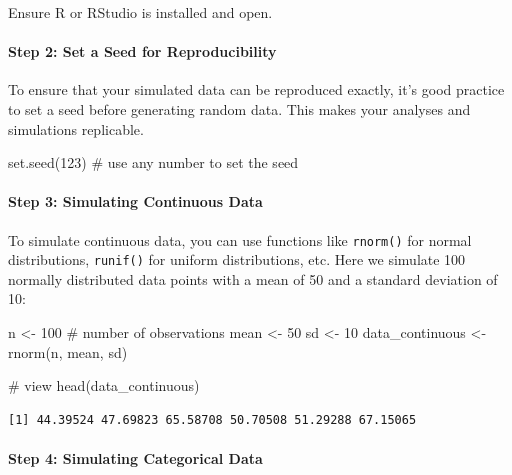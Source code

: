 \documentclass[
  singlecolumn]{article}
\let\oldparagraph\paragraph
\renewcommand{\paragraph}[1]{\oldparagraph{#1}\mbox{}}
\newenvironment{Shaded}{}{}
\newcommand{\CommentTok}[1]{\textcolor[rgb]{0.42,0.45,0.49}{#1}}
\newcommand{\DecValTok}[1]{\textcolor[rgb]{0.00,0.36,0.77}{#1}}
\newcommand{\FunctionTok}[1]{\textcolor[rgb]{0.44,0.26,0.76}{#1}}
\newcommand{\NormalTok}[1]{\textcolor[rgb]{0.14,0.16,0.18}{#1}}
\newcommand{\OtherTok}[1]{\textcolor[rgb]{0.44,0.26,0.76}{#1}}
\theoremstyle{definition}
\theoremstyle{remark}
\begin{document}
Ensure R or RStudio is installed and open.

\paragraph{Step 2: Set a Seed for
Reproducibility}\label{step-2-set-a-seed-for-reproducibility}

To ensure that your simulated data can be reproduced exactly, it's good
practice to set a seed before generating random data. This makes your
analyses and simulations replicable.

\begin{Shaded}
\begin{Highlighting}[]
\FunctionTok{set.seed}\NormalTok{(}\DecValTok{123}\NormalTok{) }\CommentTok{\# use any number to set the seed}
\end{Highlighting}
\end{Shaded}

\paragraph{Step 3: Simulating Continuous
Data}\label{step-3-simulating-continuous-data}

To simulate continuous data, you can use functions like \texttt{rnorm()}
for normal distributions, \texttt{runif()} for uniform distributions,
etc. Here we simulate 100 normally distributed data points with a mean
of 50 and a standard deviation of 10:

\begin{Shaded}
\begin{Highlighting}[]
\NormalTok{n }\OtherTok{\textless{}{-}} \DecValTok{100} \CommentTok{\# number of observations}
\NormalTok{mean }\OtherTok{\textless{}{-}} \DecValTok{50}
\NormalTok{sd }\OtherTok{\textless{}{-}} \DecValTok{10}
\NormalTok{data\_continuous }\OtherTok{\textless{}{-}} \FunctionTok{rnorm}\NormalTok{(n, mean, sd)}

\CommentTok{\# view}
\FunctionTok{head}\NormalTok{(data\_continuous)}
\end{Highlighting}
\end{Shaded}

\begin{verbatim}
[1] 44.39524 47.69823 65.58708 50.70508 51.29288 67.15065
\end{verbatim}

\paragraph{Step 4: Simulating Categorical
Data}\label{step-4-simulating-categorical-data}
\end{document}
